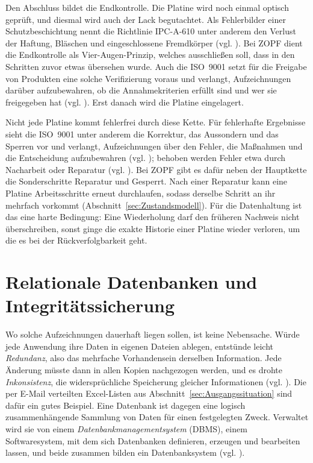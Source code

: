 Den Abschluss bildet die Endkontrolle. Die Platine wird noch einmal optisch
geprüft, und diesmal wird auch der Lack begutachtet. Als Fehlerbilder einer
Schutzbeschichtung nennt die Richtlinie IPC-A-610 unter anderem den Verlust der
Haftung, Bläschen und eingeschlossene Fremdkörper (vgl.
\cite[S.~45]{suppaAnforderungenSchutzlackierung2013}). Bei ZOPF dient die
Endkontrolle als Vier-Augen-Prinzip, welches ausschließen soll, dass in den
Schritten zuvor etwas übersehen wurde. Auch die ISO~9001 setzt für die Freigabe
von Produkten eine solche Verifizierung voraus und verlangt, Aufzeichnungen
darüber aufzubewahren, ob die Annahmekriterien erfüllt sind und wer sie
freigegeben hat (vgl. \cite[S.~103]{koubekDINISO90012018}). Erst danach wird
die Platine eingelagert.

Nicht jede Platine kommt fehlerfrei durch diese Kette. Für fehlerhafte
Ergebnisse sieht die ISO~9001 unter anderem die Korrektur, das Aussondern und
das Sperren vor und verlangt, Aufzeichnungen über den Fehler, die Maßnahmen und
die Entscheidung aufzubewahren (vgl. \cite[S.~105]{koubekDINISO90012018});
behoben werden Fehler etwa durch Nacharbeit oder Reparatur (vgl.
\cite[S.~106]{koubekDINISO90012018}). Bei ZOPF gibt es dafür neben der
Hauptkette die Sonderschritte Reparatur und Gesperrt. Nach einer Reparatur kann
eine Platine Arbeitsschritte erneut durchlaufen, sodass derselbe Schritt an ihr
mehrfach vorkommt (Abschnitt~\ref{sec:Zustandsmodell}). Für die Datenhaltung
ist das eine harte Bedingung: Eine Wiederholung darf den früheren Nachweis nicht
überschreiben, sonst ginge die exakte Historie einer Platine wieder verloren, um die es bei der
Rückverfolgbarkeit geht.

\section{Relationale Datenbanken und Integritätssicherung}
\label{sec:RelationaleDatenbanken}
Wo solche Aufzeichnungen dauerhaft liegen sollen, ist keine Nebensache. Würde
jede Anwendung ihre Daten in eigenen Dateien ablegen, entstünde leicht
\emph{Redundanz}, also das mehrfache Vorhandensein derselben Information. Jede
Änderung müsste dann in allen Kopien nachgezogen werden, und es drohte
\emph{Inkonsistenz}, die widersprüchliche Speicherung gleicher Informationen
(vgl. \cite[S.~20]{kudrassDatenbankenGrundlagenUnd2015}). Die per E-Mail
verteilten Excel-Listen aus Abschnitt~\ref{sec:Ausgangssituation} sind dafür
ein gutes Beispiel. Eine Datenbank ist dagegen eine logisch zusammenhängende
Sammlung von Daten für einen festgelegten Zweck. Verwaltet wird sie von einem
\emph{Datenbankmanagementsystem} (DBMS), einem Softwaresystem, mit dem sich
Datenbanken definieren, erzeugen und bearbeiten lassen, und beide zusammen
bilden ein Datenbanksystem (vgl.
\cite[S.~20\,f.]{kudrassDatenbankenGrundlagenUnd2015}).

